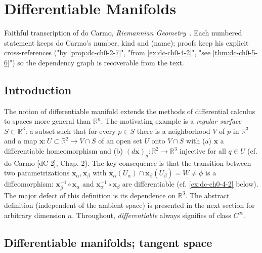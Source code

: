 \chapter{Differentiable Manifolds}
\label{chap:dc-differentiable-manifolds}

Faithful transcription of do Carmo, \emph{Riemannian Geometry}~\cite{doCarmo}. Each numbered
statement keeps do Carmo's number, kind and (name); proofs keep his explicit
cross-references ("by \cref{prop:dc-ch0-2-7}", "from \cref{ex:dc-ch0-4-2}", "see \cref{thm:dc-ch0-5-6}")
so the dependency graph is recoverable from the text.

\section{Introduction}

The notion of differentiable manifold extends the methods of differential
calculus to spaces more general than $\mathbb{R}^n$. The motivating example is a
\emph{regular surface} $S\subset\mathbb{R}^3$: a subset such that for every $p\in S$
there is a neighborhood $V$ of $p$ in $\mathbb{R}^3$ and a map
$\mathbf{x}:U\subset\mathbb{R}^2\to V\cap S$ of an open set $U$ onto $V\cap S$
with (a) $\mathbf{x}$ a differentiable homeomorphism and (b)
$(d\mathbf{x})_q:\mathbb{R}^2\to\mathbb{R}^3$ injective for all $q\in U$ (cf.
do Carmo [dC 2], Chap. 2). The key consequence is that the transition between
two parametrizations $\mathbf{x}_\alpha,\mathbf{x}_\beta$ with
$\mathbf{x}_\alpha(U_\alpha)\cap\mathbf{x}_\beta(U_\beta)=W\neq\phi$ is a
diffeomorphism: $\mathbf{x}_\beta^{-1}\circ\mathbf{x}_\alpha$ and
$\mathbf{x}_\alpha^{-1}\circ\mathbf{x}_\beta$ are differentiable (cf. \cref{ex:dc-ch0-4-2}
below). The major defect of this definition is its dependence on $\mathbb{R}^3$.
The abstract definition (independent of the ambient space) is presented in the
next section for arbitrary dimension $n$. Throughout, \emph{differentiable} always
signifies of class $C^\infty$.

\section{Differentiable manifolds; tangent space}

